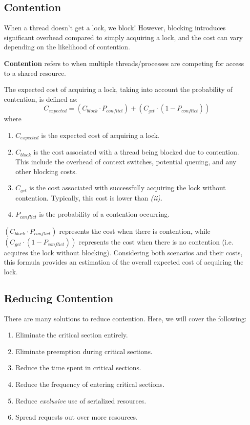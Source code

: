 \documentclass{report}
\newcommand{\definitionBegin}[1]{\begin{tcolorbox}[title={Definition: #1}]}
\newcommand{\definitionEnd}{\end{tcolorbox}}
\begin{document}
\subsection{Contention}
When a thread doesn't get a lock, we block! However, blocking introduces significant overhead
compared to simply acquiring a lock, and the cost can vary depending on the likelihood of
contention.

\definitionBegin{Contention}
\textbf{Contention} refers to when multiple threads/processes are competing for access to a shared
resource. 
\definitionEnd

The expected cost of acquiring a lock, taking into account the probability of contention, is defined as:
\[C_\textit{expected} = (C_\textit{block} \cdot P_\textit{conflict}) + (C_\textit{get} \cdot (1 -
  P_\textit{conflict}))\]
where

\begin{enumerate}[label=\textit{(\roman*)}]
\item $C_\textit{expected}$ is the expected cost of acquiring a lock.
\item $C_\textit{block}$ is the cost associated with a thread being blocked due to contention. This
  include the overhead of context switches, potential queuing, and any other blocking costs.
\item $C_\textit{get}$ is the cost associated with successfully acquiring the lock without
  contention. Typically, this cost is lower than \textit{(ii)}.
\item $P_\textit{conflict}$ is the probability of a contention occurring.
\end{enumerate}
$(C_\textit{block} \cdot P_\textit{conflict})$ represents the cost when there is contention, while
$(C_\textit{get} \cdot (1 - P_\textit{conflict}))$ represents the cost when there is no contention
(i.e. acquires the lock without blocking). Considering both scenarios and their costs, this formula
provides an estimation of the overall expected cost of acquiring the lock.


\subsection{Reducing Contention}
There are many solutions to reduce contention. Here, we will cover the following:
\begin{enumerate}[label=\textit{(\roman*)}]
\item Eliminate the critical section entirely.
\item Eliminate preemption during critical sections.
\item Reduce the time spent in critical sections.
\item Reduce the frequency of entering critical sections.
\item Reduce \textit{exclusive} use of serialized resources.
\item Spread requests out over more resources.
\end{enumerate}
\end{document}
